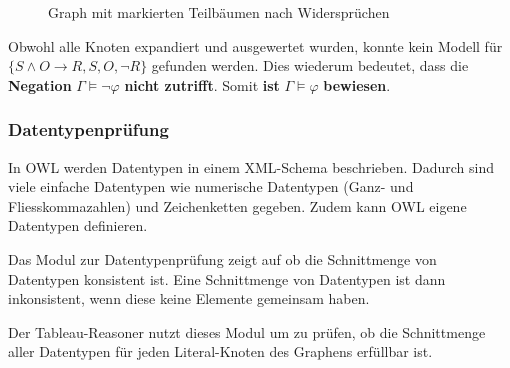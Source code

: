 \begin{figure}[htbp]
    \centering
    \caption{Graph mit markierten Teilbäumen nach Widersprüchen}
\end{figure}

Obwohl alle Knoten expandiert und ausgewertet wurden,  konnte kein Modell für $\{S \wedge O \rightarrow R, S, O, \neg R\}$ gefunden werden. Dies wiederum bedeutet, dass die \textbf{Negation} $\Gamma \models \neg\varphi$ \textbf{nicht zutrifft}. Somit \textbf{ist} $\Gamma \models \varphi$ \textbf{bewiesen}.

\subsubsection{Datentypenprüfung}
\label{ssubsection:inferenz_pellet_datatypes}
In OWL werden Datentypen in einem XML-Schema beschrieben. Dadurch sind viele einfache Datentypen wie numerische Datentypen (Ganz- und Fliesskommazahlen) und Zeichenketten gegeben. Zudem kann OWL eigene Datentypen definieren.

Das Modul zur Datentypenprüfung zeigt auf ob die Schnittmenge von Datentypen konsistent ist. Eine Schnittmenge von Datentypen ist dann inkonsistent, wenn diese keine Elemente gemeinsam haben.

Der Tableau-Reasoner nutzt dieses Modul um zu prüfen, ob die Schnittmenge aller Datentypen für jeden Literal-Knoten des Graphens erfüllbar ist.

